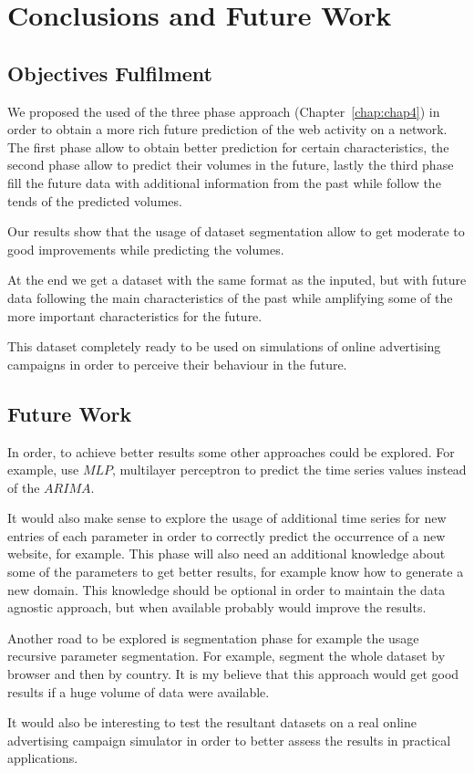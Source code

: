 \chapter{Conclusions and Future Work} \label{chap:concl}

\section*{}

\section{Objectives Fulfilment}

We proposed the used of the three phase approach (Chapter~\ref{chap:chap4}) in
order to obtain a more rich future prediction of the web activity on a network.
The first phase allow to obtain better prediction for certain characteristics,
the second phase allow to predict their volumes in the future, lastly the third
phase fill the future data with additional information from the past while follow
the tends of the predicted volumes.

Our results show that the usage of dataset segmentation allow to get moderate to
good improvements while predicting the volumes.

At the end we get a dataset with the same format as the inputed, but with future
data following the main characteristics of the past while amplifying some of the
more important characteristics for the future.

This dataset completely ready to be used on simulations of online advertising
campaigns in order to perceive their behaviour in the future.

\section{Future Work}

In order, to achieve better results some other approaches could be explored. For
example, use $MLP$, multilayer perceptron to predict the time series values
instead of the $ARIMA$.

It would also make sense to explore the usage of additional time series for new
entries of each parameter in order to correctly predict the occurrence of a new
website, for example. This phase will also need an additional knowledge about
some of the parameters to get better results, for example know how to generate a
new domain. This knowledge should be optional in order to maintain the data
agnostic approach, but when available probably would improve the results.

Another road to be explored is segmentation phase for example the usage
recursive parameter segmentation. For example, segment the whole dataset by
browser and then by country. It is my believe that this approach would get good
results if a huge volume of data were available.

It would also be interesting to test the resultant datasets on a real online
advertising campaign simulator in order to better assess the results in practical
applications.

